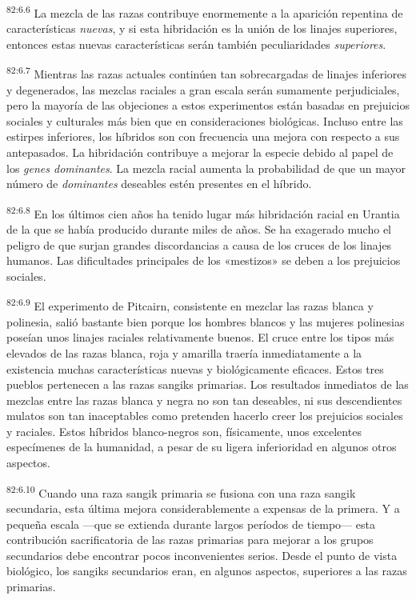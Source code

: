 \par
\textsuperscript{82:6.6} La mezcla de las razas contribuye enormemente a la aparición repentina de características \textit{nuevas}, y si esta hibridación es la unión de los linajes superiores, entonces estas nuevas características serán también peculiaridades \textit{superiores}.

\par
\textsuperscript{82:6.7} Mientras las razas actuales continúen tan sobrecargadas de linajes inferiores y degenerados, las mezclas raciales a gran escala serán sumamente perjudiciales, pero la mayoría de las objeciones a estos experimentos están basadas en prejuicios sociales y culturales más bien que en consideraciones biológicas. Incluso entre las estirpes inferiores, los híbridos son con frecuencia una mejora con respecto a sus antepasados. La hibridación contribuye a mejorar la especie debido al papel de los \textit{genes dominantes}. La mezcla racial aumenta la probabilidad de que un mayor número de \textit{dominantes} deseables estén presentes en el híbrido.

\par
\textsuperscript{82:6.8} En los últimos cien años ha tenido lugar más hibridación racial en Urantia de la que se había producido durante miles de años. Se ha exagerado mucho el peligro de que surjan grandes discordancias a causa de los cruces de los linajes humanos. Las dificultades principales de los «mestizos» se deben a los prejuicios sociales.

\par
\textsuperscript{82:6.9} El experimento de Pitcairn, consistente en mezclar las razas blanca y polinesia, salió bastante bien porque los hombres blancos y las mujeres polinesias poseían unos linajes raciales relativamente buenos. El cruce entre los tipos más elevados de las razas blanca, roja y amarilla traería inmediatamente a la existencia muchas características nuevas y biológicamente eficaces. Estos tres pueblos pertenecen a las razas sangiks primarias. Los resultados inmediatos de las mezclas entre las razas blanca y negra no son tan deseables, ni sus descendientes mulatos son tan inaceptables como pretenden hacerlo creer los prejuicios sociales y raciales. Estos híbridos blanco-negros son, físicamente, unos excelentes especímenes de la humanidad, a pesar de su ligera inferioridad en algunos otros aspectos.

\par
\textsuperscript{82:6.10} Cuando una raza sangik primaria se fusiona con una raza sangik secundaria, esta última mejora considerablemente a expensas de la primera. Y a pequeña escala ---que se extienda durante largos períodos de tiempo--- esta contribución sacrificatoria de las razas primarias para mejorar a los grupos secundarios debe encontrar pocos inconvenientes serios. Desde el punto de vista biológico, los sangiks secundarios eran, en algunos aspectos, superiores a las razas primarias.

